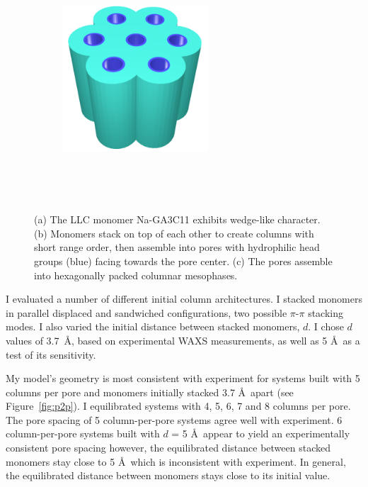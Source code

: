 \documentclass{article}
\begin{document}
\begin{figure}[!htb]
\begin{subfigure}{0.325\linewidth}
              \centering
              \includegraphics[width=0.6\textwidth]{hexagonal_packing.pdf}
              \caption{}~\label{fig:hex_packing_simple}
      \end{subfigure}
      \caption{(a) The LLC monomer Na-GA3C11 exhibits wedge-like character. (b) 
      Monomers stack on top of each other to create columns with short range order,
      then assemble into pores with hydrophilic head groups (blue) facing towards 
      the pore center. (c) The pores assemble into hexagonally packed columnar
      mesophases.}~\label{fig:assembly}
      \vspace{-0.5cm}
  \end{figure}
  
  I evaluated a number of different initial column architectures. I stacked 
  monomers in parallel displaced and sandwiched configurations, two possible
  $\pi$-$\pi$ stacking modes.\cite{sinnokrot_estimates_2002} I also varied 
  the initial distance between stacked monomers, $d$. I chose $d$ values of 
  3.7~\AA, based on experimental WAXS measurements, as well as 5 \AA~as a 
  test of its sensitivity.
  
  My model's geometry is most consistent with experiment for systems built
  with 5 columns per pore and monomers initially stacked 3.7 \AA~apart
  (see Figure~\ref{fig:p2p}). I equilibrated systems with 4, 5, 6, 7 and 
  8 columns per pore. The pore spacing of 5 column-per-pore systems agree
  well with experiment. 6 column-per-pore systems built with $d$ = 5 \AA~appear
  to yield an experimentally consistent pore spacing however, the equilibrated
  distance between stacked monomers stay close to 5 \AA~which is inconsistent
  with experiment. In general, the equilibrated distance between monomers stays
  close to its initial value. 
  
\end{document}
